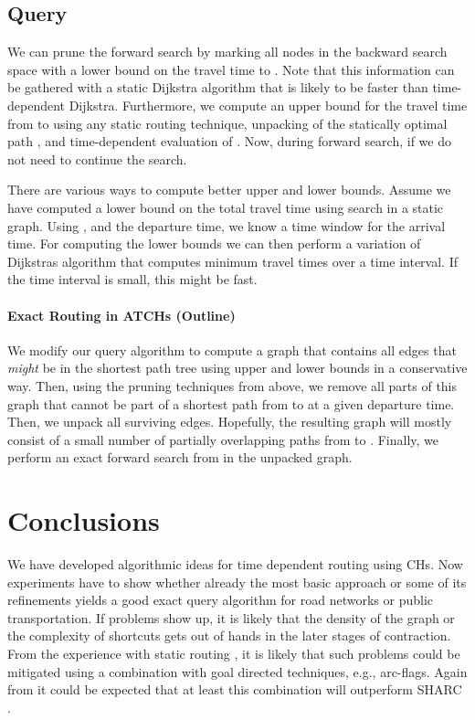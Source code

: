 \documentclass[12pt]{article}
\begin{document}
\subsection{Query}\label{ss:qrefinements}

We can prune the forward search by marking all nodes  in the 
backward search space with a lower bound  on the travel time to .
Note that this information can be gathered with a static Dijkstra algorithm
that is likely to be faster than time-dependent Dijkstra.
Furthermore, we compute an upper bound  for the travel time from  to 
using any static routing technique, unpacking of the statically optimal path ,
and time-dependent evaluation of .
Now, during forward search, if  we do not need to continue
the search. 

There are various ways to compute better upper and lower bounds.
Assume we have computed a lower bound  on the total travel time
using search in a static graph. Using ,  and the departure time,
we know a time window  for the arrival time.
For computing the lower bounds  we can then perform 
a variation of Dijkstras algorithm that computes minimum
travel times over a time interval. If the time interval is small,
this might be fast.

\paragraph*{Exact Routing in ATCHs (Outline)}
We modify our query algorithm to compute a graph that contains all edges
that \emph{might} be in the shortest path tree using upper and lower bounds
in a conservative way. Then, using the pruning techniques from above,
we remove all parts of this graph that cannot be part of a shortest path
from  to  at a given departure time. 
Then, we unpack all surviving edges. Hopefully, the resulting
graph will mostly consist of a small number of partially overlapping
paths from  to .
Finally,
we perform an exact forward search from  in the unpacked graph.



\section{Conclusions}\label{s:conclusions}

We have developed algorithmic ideas for time dependent routing using CHs.
Now experiments have to show whether already the most basic approach
or some of its refinements yields a good exact query algorithm for road networks
or public transportation.
If problems show up, it is likely that the density of the graph or
the complexity of shortcuts gets out of hands in the later stages
of contraction. From the experience with static routing
\cite{BDSSSW08}, it is likely that such problems could be mitigated using
a combination with goal directed techniques, e.g., arc-flags. 
Again from \cite{BDSSSW08} it could be expected that at least this 
combination will outperform SHARC \cite{Del08}.
\end{document}
